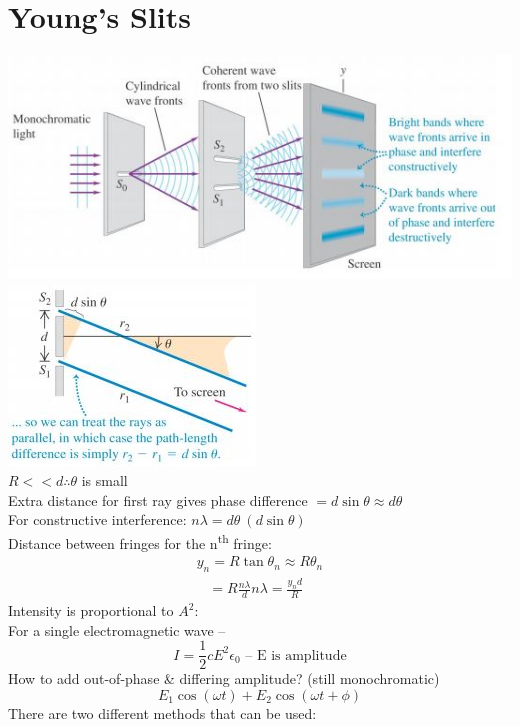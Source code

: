 \documentclass[a4paper, 11pt, fleqn, normalem]{report}
\begin{document}
\section{Young's Slits}
\includegraphics{Young1.jpg} \\
\includegraphics{Young2.jpg} \\
$R << d \therefore \theta$ is small \\
Extra distance for first ray gives phase difference $= d\sin{\theta} \approx d\theta$ \\
For constructive interference: $n\lambda = d\theta~(d\sin{\theta})$ \\
Distance between fringes for the n\textsuperscript{th} fringe:
\begin{gather*}
    y_{n} = R\tan{\theta_{n}} \approx R\theta_{n} \\
    ~~~\, = R\frac{n\lambda}{d}
    n\lambda = \frac{y_{n}d}{R}
\end{gather*}
Intensity is proportional to $A^{2}$:\\
For a single electromagnetic wave --
\begin{equation*}
    I = \frac{1}{2}cE^{2}\epsilon_{0}\text{ -- E is amplitude}
\end{equation*}
How to add out-of-phase \& differing amplitude? (still monochromatic)
\begin{equation*}
    E_{1}\cos{(\omega t)} + E_{2}\cos{(\omega t + \phi)}
\end{equation*}
There are two different methods that can be used: \\
\end{document}
